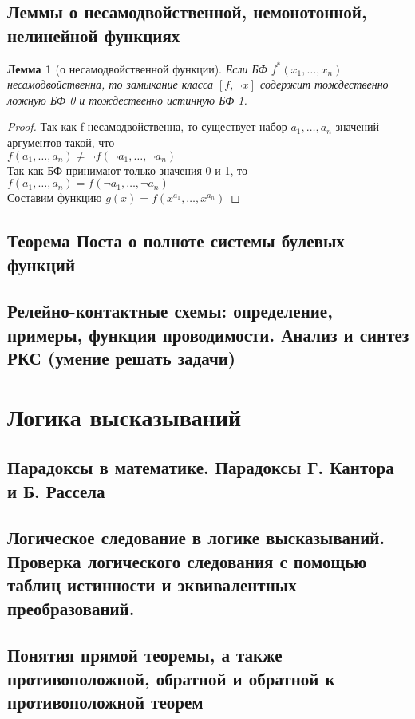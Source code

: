 \documentclass[a4paper]{article}
\newtheorem{lemma}{Лемма}[section]
\theoremstyle{definition}
\theoremstyle{remark}
\begin{document}
    \subsection{Леммы о несамодвойственной, немонотонной, нелинейной функциях}
    \begin{lemma}[о несамодвойственной функции]
        Если БФ $f^*(x_1, \dots, x_n)$ несамодвойственна, то замыкание класса $[f, \neg x]$
        содержит тождественно ложную БФ 0 и тождественно истинную БФ 1.
    \end{lemma}
    \begin{proof}
        Так как f несамодвойственна, то существует набор $a_1, \dots, a_n$
        значений аргументов такой, что \\ $f(a_1, \dots, a_n) \neq \neg f(\neg a_1, \dots, \neg a_n)$ \\
        Так как БФ принимают только значения 0 и 1, то $f(a_1, \dots, a_n) = f(\neg a_1, \dots, \neg a_n)$ \\
        Составим функцию $g(x) = f(x^{a_1}, \dots, x^{a_n})$

    \end{proof}
    \subsection{Теорема Поста о полноте системы булевых функций}
    \subsection{Релейно-контактные схемы: определение, примеры, функция проводимости. Анализ и синтез РКС (умение решать задачи)}
    \section{Логика высказываний}
    \subsection{Парадоксы в математике. Парадоксы Г. Кантора и  Б. Рассела}
    \subsection{Логическое следование в логике высказываний. Проверка логического следования с помощью таблиц истинности и  эквивалентных преобразований.}
    \subsection{Понятия прямой теоремы, а также противоположной, обратной и обратной к противоположной теорем}
\end{document}
